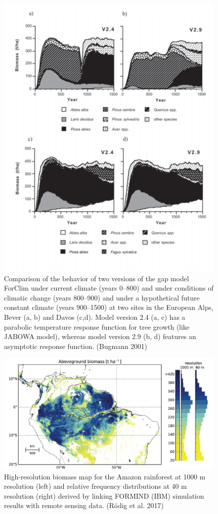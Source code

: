 \documentclass[12pt,oneside]{book}
\begin{document}
\begin{figure}

{\centering \includegraphics[width=0.8\linewidth]{figures/chap6/f612_forclim_succession} 

}

\caption{Comparison of the behavior of two versions of the gap model ForClim under current climate (years 0–800) and under conditions of climatic change (years 800–900) and under a hypothetical future constant climate (years 900–1500) at two sites in the European Alps, Bever (a, b) and Davos (c,d). Model version 2.4 (a, c) has a parabolic temperature response function for tree growth (like JABOWA model), whereas model version 2.9 (b, d) features an asymptotic response function. (Bugmann 2001)}\label{fig:f612}
\end{figure}

\begin{figure}

{\centering \includegraphics[width=0.8\linewidth]{figures/chap6/f613_formind_amazon} 

}

\caption{High-resolution biomass map for the Amazon rainforest at 1000 m resolution (left) and relative frequency distributions at 40 m resolution (right) derived by linking FORMIND (IBM) simulation results with remote sensing data. (Rödig et al. 2017)}\label{fig:f613}
\end{figure}
\end{document}
